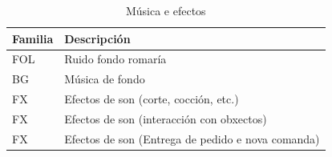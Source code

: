 \documentclass{report}  %
\begin{document}
\begin{table}[h]
    \centering
    \renewcommand{\arraystretch}{1.3} %
    \setlength{\tabcolsep}{10pt} %
    \label{tab:muxica}
    \begin{tabular}{|p{4cm}|p{9cm}|}
        \hline
        \rowcolor{octopus} %
        \textbf{Familia}  & \textbf{Descripción} \\
        \hline
        FOL & Ruido fondo romaría \\
        \hline
        BG & Música de fondo \\
        \hline
        FX & Efectos de son (corte, cocción, etc.) \\
        \hline
        FX & Efectos de son (interacción con obxectos) \\
        \hline
        FX & Efectos de son (Entrega de pedido e nova comanda) \\
        \hline
    \end{tabular}
    \caption{Música e efectos}
\end{table}
\end{document}
